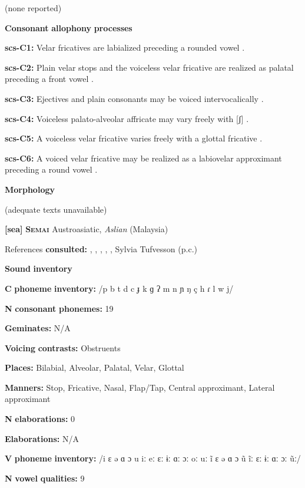 \begin{styleBody}
(none reported)

\textbf{Consonant} \textbf{allophony} \textbf{processes}

\textbf{scs-C1:} Velar fricatives are labialized preceding a rounded vowel \citep[31]{Rice1989}.

\textbf{scs-C2:} Plain velar stops and the voiceless velar fricative are realized as palatal preceding a front vowel \citep[31]{Rice1989}.

\textbf{scs-C3:} Ejectives and plain consonants may be voiced intervocalically \citep[31]{Rice1989}.

\textbf{scs-C4:} Voiceless palato-alveolar affricate may vary freely with [ʃ] \citep[35]{Rice1989}.

\textbf{scs-C5:} A voiceless velar fricative varies freely with a glottal fricative \citep[32]{Rice1989}.

\textbf{scs-C6:} A voiced velar fricative may be realized as a labiovelar approximant preceding a round vowel \citep[32]{Rice1989}.

\textbf{Morphology}

(adequate texts unavailable)

\textbf{[sea]}   \textbf{\textsc{Semai}  }  Austroasiatic, \textit{Aslian} (Malaysia)

References \textbf{consulted:} \citet{Dentan2003}, \citet{Diffloth1976a}, \citet{Diffloth1976b}, \citet{Philips2007}, \citet{Sloan1988}, Sylvia Tufvesson (p.c.)

\textbf{Sound} \textbf{inventory}

\textbf{C} \textbf{phoneme} \textbf{inventory:} /p b t d c ɟ k ɡ ʔ m n ɲ ŋ ç h ɾ l w j/

\textbf{N} \textbf{consonant} \textbf{phonemes:} 19

\textbf{Geminates:} N/A

\textbf{Voicing} \textbf{contrasts:} Obstruents

\textbf{Places:} Bilabial, Alveolar, Palatal, Velar, Glottal

\textbf{Manners:} Stop, Fricative, Nasal, Flap/Tap, Central approximant, Lateral approximant

\textbf{N} \textbf{elaborations:} 0

\textbf{Elaborations:} N/A

\textbf{V} \textbf{phoneme} \textbf{inventory:} /i ɛ ə ɑ ɔ u iː eː ɛː ɨː ɑː ɔː oː uː ĩ ɛ ə ɑ ɔ ũ ĩː ɛː ɨː ɑː ɔː ũː/

\textbf{N} \textbf{vowel} \textbf{qualities:} 9


\end{styleBody}
